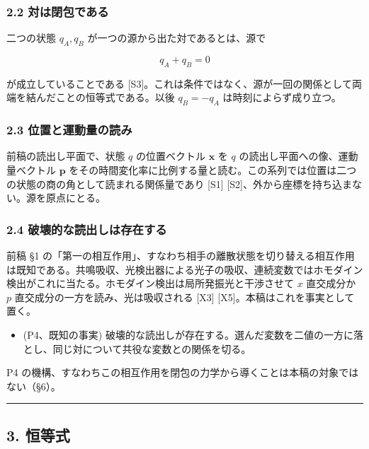 \documentclass[
  a4paper,
]{ltjsarticle}
\providecommand{\tightlist}{%
  \setlength{\itemsep}{0pt}\setlength{\parskip}{0pt}}
\begin{document}
\subsubsection{2.2
対は閉包である}\label{ux5bfeux306fux9589ux5305ux3067ux3042ux308b}

二つの状態 \(q_A, q_B\) が一つの源から出た対であるとは、源で

\[
q_A+q_B=0
\]

が成立していることである
{[}S3{]}。これは条件ではなく、源が一回の関係として両端を結んだことの恒等式である。以後
\(q_B=-q_A\) は時刻によらず成り立つ。

\subsubsection{2.3
位置と運動量の読み}\label{ux4f4dux7f6eux3068ux904bux52d5ux91cfux306eux8aadux307f}

前稿の読出し平面で、状態 \(q\) の位置ベクトル \(\boldsymbol{x}\) を
\(q\) の読出し平面への像、運動量ベクトル \(\boldsymbol{p}\)
をその時間変化率に比例する量と読む。この系列では位置は二つの状態の商の角として読まれる関係量であり
{[}S1{]} {[}S2{]}、外から座標を持ち込まない。源を原点にとる。

\subsubsection{2.4
破壊的な読出しは存在する}\label{ux7834ux58caux7684ux306aux8aadux51faux3057ux306fux5b58ux5728ux3059ux308b}

前稿 §1
の「第一の相互作用」、すなわち相手の離散状態を切り替える相互作用は既知である。共鳴吸収、光検出器による光子の吸収、連続変数ではホモダイン検出がこれに当たる。ホモダイン検出は局所発振光と干渉させて
\(x\) 直交成分か \(p\) 直交成分の一方を読み、光は吸収される {[}X3{]}
{[}X5{]}。本稿はこれを事実として置く。

\begin{itemize}
\tightlist
\item
  (P4、既知の事実)
  破壊的な読出しが存在する。選んだ変数を二値の一方に落とし、同じ対について共役な変数との関係を切る。
\end{itemize}

P4
の機構、すなわちこの相互作用を閉包の力学から導くことは本稿の対象ではない（§6）。

\begin{center}\rule{0.5\linewidth}{0.5pt}\end{center}

\subsection{3. 恒等式}\label{ux6052ux7b49ux5f0f}
\end{document}

